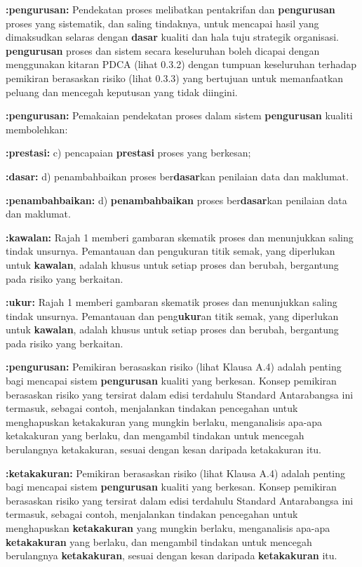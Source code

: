 \documentclass{article}
\begin{document}
\textbf{:pengurusan:} Pendekatan proses melibatkan pentakrifan dan \textbf{pengurusan} proses yang sistematik, dan
saling tindaknya, untuk mencapai hasil yang dimaksudkan selaras dengan \textbf{dasar} kualiti dan
hala tuju strategik organisasi. \textbf{pengurusan} proses dan sistem secara keseluruhan boleh
dicapai dengan menggunakan kitaran PDCA (lihat 0.3.2) dengan tumpuan keseluruhan
terhadap pemikiran berasaskan risiko (lihat 0.3.3) yang bertujuan untuk memanfaatkan
peluang dan mencegah keputusan yang tidak diingini.

\textbf{:pengurusan:} Pemakaian pendekatan proses dalam sistem \textbf{pengurusan} kualiti membolehkan:

\textbf{:prestasi:} c) pencapaian \textbf{prestasi} proses yang berkesan;

\textbf{:dasar:} d) penambahbaikan proses ber\textbf{dasar}kan penilaian data dan maklumat.

\textbf{:penambahbaikan:} d) \textbf{penambahbaikan} proses ber\textbf{dasar}kan penilaian data dan maklumat.

\textbf{:kawalan:} Rajah 1 memberi gambaran skematik proses dan menunjukkan saling tindak unsurnya.
Pemantauan dan pengukuran titik semak, yang diperlukan untuk \textbf{kawalan}, adalah khusus
untuk setiap proses dan berubah, bergantung pada risiko yang berkaitan.

\textbf{:ukur:} Rajah 1 memberi gambaran skematik proses dan menunjukkan saling tindak unsurnya.
Pemantauan dan peng\textbf{ukur}an titik semak, yang diperlukan untuk \textbf{kawalan}, adalah khusus
untuk setiap proses dan berubah, bergantung pada risiko yang berkaitan.

\textbf{:pengurusan:} Pemikiran berasaskan risiko (lihat Klausa A.4) adalah penting bagi mencapai sistem
\textbf{pengurusan} kualiti yang berkesan. Konsep pemikiran berasaskan risiko yang tersirat dalam
edisi terdahulu Standard Antarabangsa ini termasuk, sebagai contoh, menjalankan tindakan
pencegahan untuk menghapuskan ketakakuran yang mungkin berlaku, menganalisis apa-apa
ketakakuran yang berlaku, dan mengambil tindakan untuk mencegah berulangnya
ketakakuran, sesuai dengan kesan daripada ketakakuran itu.

\textbf{:ketakakuran:} Pemikiran berasaskan risiko (lihat Klausa A.4) adalah penting bagi mencapai sistem
\textbf{pengurusan} kualiti yang berkesan. Konsep pemikiran berasaskan risiko yang tersirat dalam
edisi terdahulu Standard Antarabangsa ini termasuk, sebagai contoh, menjalankan tindakan
pencegahan untuk menghapuskan \textbf{ketakakuran} yang mungkin berlaku, menganalisis apa-apa
\textbf{ketakakuran} yang berlaku, dan mengambil tindakan untuk mencegah berulangnya
\textbf{ketakakuran}, sesuai dengan kesan daripada \textbf{ketakakuran} itu.
\end{document}
